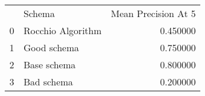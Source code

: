 \begin{tabular}{llr}
 & Schema & Mean Precision At 5 \\
0 & Rocchio Algorithm & 0.450000 \\
1 & Good schema & 0.750000 \\
2 & Base schema & 0.800000 \\
3 & Bad schema & 0.200000 \\
\end{tabular}
